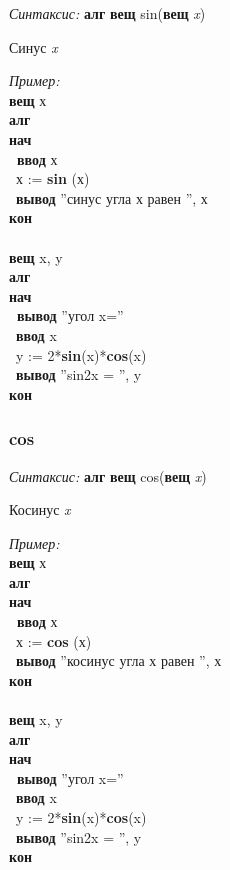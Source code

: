 \documentclass[12pt,a4paper]{article}
\newcommand{\otstup}{\textperiodcentered\ }
\begin{document}
\emph{Синтаксис:} \textbf{алг} \textbf{вещ} sin(\textbf{вещ} \emph{x})


  
    
		Синус \emph{x}

      
\emph{Пример:} 
\sffamily
~\\\textbf{вещ} х
~\\\textbf{алг 
~\\нач
~\\\otstup ввод} х
~\\\otstup х := \textbf{sin} (х)
~\\\otstup \textbf{вывод} ''синус угла х равен '', х
~\\\textbf{кон}
~\\
~\\\textbf{вещ} x, y
~\\\textbf{алг 
~\\нач
~\\\otstup вывод} ''угол x=''
~\\\otstup \textbf{ввод} x
~\\\otstup y := 2*\textbf{sin}(x)*\textbf{cos}(x)
~\\\otstup \textbf{вывод} ''sin2x = '', y
~\\\textbf{кон}


\normalfont
\subsubsection{cos}

\emph{Синтаксис:} \textbf{алг} \textbf{вещ} cos(\textbf{вещ} \emph{x})


     
 
		Косинус \emph{x}
      
\emph{Пример:} 
\sffamily
~\\\textbf{вещ} х
~\\\textbf{алг 
~\\нач
~\\\otstup ввод} х
~\\\otstup х := \textbf{cos} (х)
~\\\otstup \textbf{вывод} ''косинус угла х равен '', х
~\\\textbf{кон}
~\\
~\\\textbf{вещ} x, y
~\\\textbf{алг 
~\\нач
~\\\otstup вывод} ''угол x=''
~\\\otstup \textbf{ввод} x
~\\\otstup y := 2*\textbf{sin}(x)*\textbf{cos}(x)
~\\\otstup \textbf{вывод} ''sin2x = '', y
~\\\textbf{кон}
\end{document}
